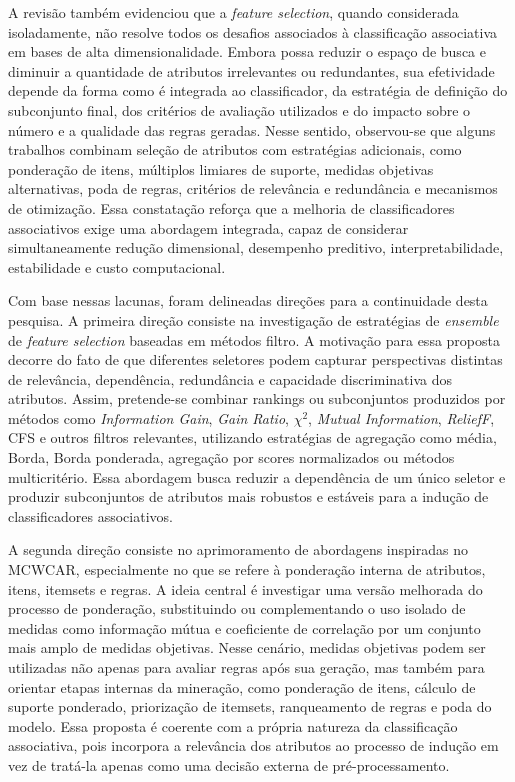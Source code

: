 A revisão também evidenciou que a \textit{feature selection}, quando considerada isoladamente, não resolve todos os desafios associados à classificação associativa em bases de alta dimensionalidade. Embora possa reduzir o espaço de busca e diminuir a quantidade de atributos irrelevantes ou redundantes, sua efetividade depende da forma como é integrada ao classificador, da estratégia de definição do subconjunto final, dos critérios de avaliação utilizados e do impacto sobre o número e a qualidade das regras geradas. Nesse sentido, observou-se que alguns trabalhos combinam seleção de atributos com estratégias adicionais, como ponderação de itens, múltiplos limiares de suporte, medidas objetivas alternativas, poda de regras, critérios de relevância e redundância e mecanismos de otimização. Essa constatação reforça que a melhoria de classificadores associativos exige uma abordagem integrada, capaz de considerar simultaneamente redução dimensional, desempenho preditivo, interpretabilidade, estabilidade e custo computacional.

Com base nessas lacunas, foram delineadas direções para a continuidade desta pesquisa. A primeira direção consiste na investigação de estratégias de \textit{ensemble} de \textit{feature selection} baseadas em métodos filtro. A motivação para essa proposta decorre do fato de que diferentes seletores podem capturar perspectivas distintas de relevância, dependência, redundância e capacidade discriminativa dos atributos. Assim, pretende-se combinar rankings ou subconjuntos produzidos por métodos como \textit{Information Gain}, \textit{Gain Ratio}, $\chi^2$, \textit{Mutual Information}, \textit{ReliefF}, CFS e outros filtros relevantes, utilizando estratégias de agregação como média, Borda, Borda ponderada, agregação por scores normalizados ou métodos multicritério. Essa abordagem busca reduzir a dependência de um único seletor e produzir subconjuntos de atributos mais robustos e estáveis para a indução de classificadores associativos.

A segunda direção consiste no aprimoramento de abordagens inspiradas no MCWCAR, especialmente no que se refere à ponderação interna de atributos, itens, itemsets e regras. A ideia central é investigar uma versão melhorada do processo de ponderação, substituindo ou complementando o uso isolado de medidas como informação mútua e coeficiente de correlação por um conjunto mais amplo de medidas objetivas. Nesse cenário, medidas objetivas podem ser utilizadas não apenas para avaliar regras após sua geração, mas também para orientar etapas internas da mineração, como ponderação de itens, cálculo de suporte ponderado, priorização de itemsets, ranqueamento de regras e poda do modelo. Essa proposta é coerente com a própria natureza da classificação associativa, pois incorpora a relevância dos atributos ao processo de indução em vez de tratá-la apenas como uma decisão externa de pré-processamento.

